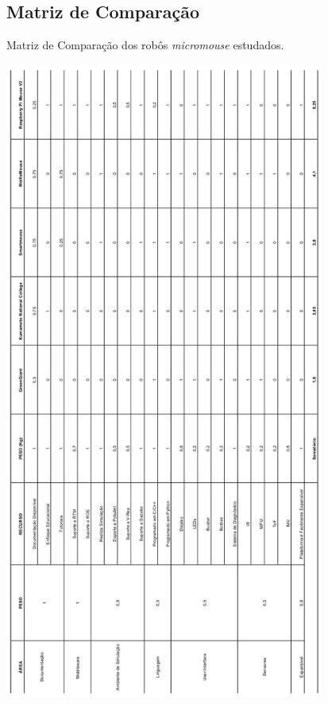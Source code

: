 \subsection{Matriz de Comparação}

\begin{table}[H]
	\centering
	\caption{Matriz de Comparação dos robôs \textit{micromouse }estudados.}
	\includegraphics[width=105mm]
	{Figures/MatrizComp_v.png}
	\label{tab:MatrizComp}
\end{table}